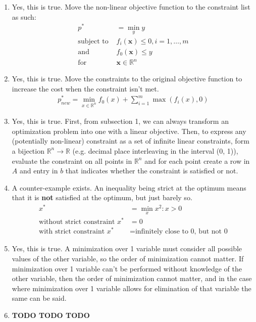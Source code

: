 \documentclass[11pt]{article}
\begin{document}
\begin{solution}
\begin{enumerate}
\item Yes, this is true. Move the non-linear objective function to the constraint list as such:
\begin{align*}
    p^* &= \min_{y} y \\
    \text{subject to } &f_i(\bm{x}) \leq 0, i = 1,\dots,m \\
    \text{and } &f_0(\bm{x}) \leq y \\
    \text{for } &\bm{x} \in \mathbb{R}^n
\end{align*}

\item Yes, this is true. Move the constraints to the original objective function to increase the cost when the constraint isn't met.
\begin{align*}
    p_{new}^* = \min_{x \in \mathbb{R}^n} f_0(x) + \sum_{i=1}^m \max(f_i(x),0)
\end{align*}

\item Yes, this is true. First, from subsection 1, we can always transform an optimization problem into one with a linear objective. Then, to express any (potentially non-linear) constraint as a set of infinite linear constraints, form a bijection $\mathbb{R}^n \rightarrow \mathbb{R}$ (e.g. decimal place interleaving in the interval (0, 1)), evaluate the constraint on all points in $\mathbb{R}^n$ and for each point create a row in $A$ and entry in $b$ that indicates whether the constraint is satisfied or not.

\item A counter-example exists. An inequality being strict at the optimum means that it is \textbf{not} satisfied at the optimum, but just barely so.
\begin{align*}
    x^* &= \min_{x} x^2 : x > 0 \\
    \text{without strict constraint } x^* &= 0 \\
    \text{with strict constraint } x^* &= \text{infinitely close to 0, but not 0}
\end{align*}

\item Yes, this is true. A minimization over 1 variable must consider all possible values of the other variable, so the order of minimization cannot matter. If minimization over 1 variable can't be performed without knowledge of the other variable, then the order of minimization cannot matter, and in the case where minimization over 1 variable allows for elimination of that variable the same can be said.

\item \textbf{TODO TODO TODO}
\end{enumerate}
\end{solution}
\end{document}
